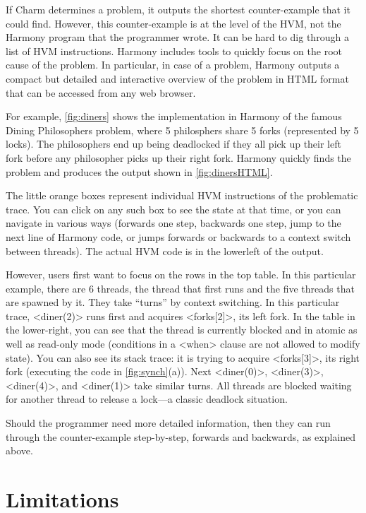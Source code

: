 \documentclass[twocolumn]{article}
\begin{document}
If Charm determines a problem, it outputs the shortest counter-example that
it could find.  However, this counter-example is at the level of the HVM,
not the Harmony program that the programmer wrote.  It can be hard to
dig through a list of HVM instructions.
Harmony includes tools to quickly focus on the root cause of the
problem.  In particular, in case of a problem, Harmony outputs a compact
but detailed and interactive overview of the problem in HTML format that
can be accessed from any web browser.

For example, \autoref{fig:diners} shows the implementation
in Harmony of the famous Dining Philosophers problem, where 5 philosphers
share 5 forks (represented by 5 locks).
The philosophers end up being deadlocked
if they all pick up their left fork before any philosopher picks up
their right fork.
Harmony quickly finds the problem and produces the output
shown in \autoref{fig:dinersHTML}.

The little orange boxes represent individual HVM instructions of the
problematic trace.  You can click on any such box to see the state
at that time, or you can navigate in various ways (forwards one step,
backwards one step, jump to the next line of Harmony code, or jumps
forwards or backwards to a context switch between threads).  The actual
HVM code is in the lowerleft of the output.

However, users first want to focus on the rows in the top table.
In this particular example, there are 6 threads, the thread that
first runs and the five threads that are spawned by it.  They take
``turns'' by context switching.  In this particular trace, <{diner(2)}>
runs first and acquires <{forks[2]}>, its left fork.  In the table
in the lower-right, you can see that the thread is currently blocked
and in atomic as well as read-only mode (conditions in a <{when}>
clause are not allowed to modify state).  You can also see its stack
trace: it is trying to acquire <{forks[3]}>, its right fork (executing
the code in \autoref{fig:synch}(a)).  Next <{diner(0)}>, <{diner(3)}>,
<{diner(4)}>, and <{diner(1)}> take similar turns.  All threads are
blocked waiting for another thread to release a lock---a classic
deadlock situation.

Should the programmer need more detailed information, then they can
run through the counter-example step-by-step, forwards and backwards,
as explained above.

\section{Limitations}
\end{document}
